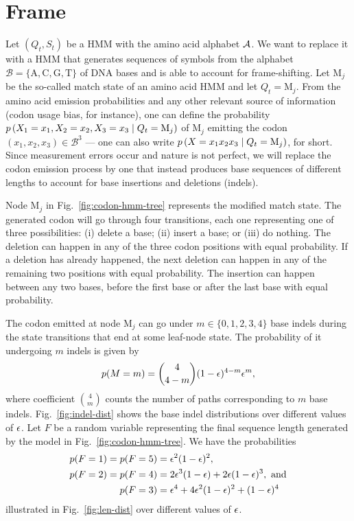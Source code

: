 \section{Frame}

Let $(Q_t, S_t)$ be a HMM with the amino acid alphabet $\mathcal{A}$.
We want to replace it with a HMM that generates sequences of symbols from the alphabet
$\mathcal B = \{\mathrm A, \mathrm C, \mathrm G, \mathrm T\}$ of DNA bases and is able to account
for frame-shifting.
Let $\mathrm M_j$ be the so-called match state of an amino acid HMM and let $Q_t=\mathrm M_j$.
From the amino acid emission probabilities and any other relevant source of information
(codon usage bias, for instance), one can define the probability $p\left(X_1=x_1, X_2=x_2, X_3=x_3\;\middle|\; Q_t=\mathrm M_j\right)$
of $\mathrm M_j$ emitting the codon $(x_1, x_2, x_3) \in \mathcal B^3$
--- one can also write $p\left(X=x_1x_2x_3\;\middle|\; Q_t=\mathrm M_j\right)$, for short.
Since measurement errors occur and nature is not perfect, we will replace the
codon emission process by one that instead produces base sequences of different
lengths to account for base insertions and deletions (indels).

Node $\mathrm M_j$ in Fig.~\ref{fig:codon-hmm-tree} represents the modified match state.
The generated codon will go through four transitions, each one representing one of three possibilities: (i) delete a base; (ii) insert a base; or (iii) do nothing.
The deletion can happen in any of the three codon positions with equal probability.
If a deletion has already happened, the next deletion can happen in any of the remaining two positions with equal probability.
The insertion can happen between any two bases, before the first base or after the last base with equal probability.

The codon emitted at node $\mathrm M_j$ can go under $m\in\{0, 1, 2, 3, 4\}$ base indels during
the state transitions that end at some leaf-node state.
The probability of it undergoing $m$ indels is given by
\begin{align*}
    p(M=m) = \binom{4}{4-m} (1 - \epsilon)^{4-m} \epsilon^m,
\end{align*}
where coefficient $\binom{4}{m}$ counts the number of paths corresponding to $m$ base indels.
Fig.~\ref{fig:indel-dist} shows the base indel distributions over different values of $\epsilon$.
Let $F$ be a random variable representing the final sequence length generated by the model in
Fig.~\ref{fig:codon-hmm-tree}.
We have the probabilities
\begin{align*}
    p(F=1) = p(F=5) &= \epsilon^2(1-\epsilon)^2, \\
    p(F=2) = p(F=4) &= 2\epsilon^3(1-\epsilon) + 2\epsilon(1-\epsilon)^3,~\text{and} \\
    p(F=3)          &= \epsilon^4 + 4\epsilon^2(1-\epsilon)^2 + (1-\epsilon)^4
\end{align*}
illustrated in Fig.~\ref{fig:len-dist} over different values of $\epsilon$.


